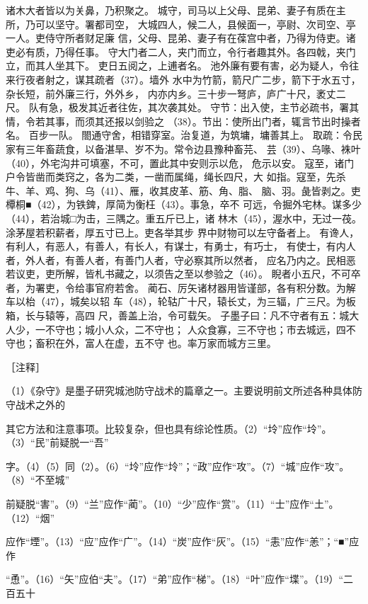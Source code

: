 \documentclass[12pt,UTF8]{ctexbook}
\begin{document}
诸木大者皆以为关鼻，乃积聚之。 
城守，司马以上父母、昆弟、妻子有质在主所，乃可以坚守。署都司空， 
大城四人，候二人，县候面一，亭尉、次司空、亭一人。吏侍守所者财足廉 
信，父母、昆弟、妻子有在葆宫中者，乃得为侍吏。诸吏必有质，乃得任事。 
守大门者二人，夹门而立，令行者趣其外。各四戟，夹门立，而其人坐其下。 
吏日五阅之，上逋者名。 
池外廉有要有害，必为疑人，令往来行夜者射之，谋其疏者（37）。墙外 
水中为竹箭，箭尺广二步，箭下于水五寸，杂长短，前外廉三行，外外乡， 
内亦内乡。三十步一弩庐，庐广十尺，袤丈二尺。 
队有急，极发其近者往佐，其次袭其处。 
守节：出入使，主节必疏书，署其情，令若其事，而须其还报以剑验之 
（38）。节出：使所出门者，辄言节出时操者名。 
百步一队。 
閤通守舍，相错穿室。治复道，为筑墉，墉善其上。 
取疏：令民家有三年畜蔬食，以备湛旱、岁不为。常令边县豫种畜芫、 
芸（39）、乌喙、袾叶（40），外宅沟井可填塞，不可，置此其中安则示以危， 
危示以安。 
寇至，诸门户令皆凿而类窍之，各为二类，一凿而属绳，绳长四尺，大 
如指。寇至，先杀牛、羊、鸡、狗、乌（41）、雁，收其皮革、筋、角、脂、 
脑、羽。彘皆剥之。吏橝桐■（42），为铁錍，厚简为衡枉（43）。事急，卒不 
可远，令掘外宅林。谋多少（44），若治城□为击，三隅之。重五斤已上，诸 
林木（45），渥水中，无过一茷。涂茅屋若积薪者，厚五寸已上。吏各举其步 
界中财物可以左守备者上。 
有谗人，有利人，有恶人，有善人，有长人，有谋士，有勇士，有巧士， 
有使士，有内人者，外人者，有善人者，有善门人者，守必察其所以然者， 
应名乃内之。民相恶若议吏，吏所解，皆札书藏之，以须告之至以参验之（46）。 
睨者小五尺，不可卒者，为署吏，令给事官府若舍。 
蔺石、厉矢诸材器用皆谨部，各有积分数。为解车以枱（47），城矣以轺 
车（48），轮轱广十尺，辕长丈，为三辐，广三尺。为板箱，长与辕等，高四 
尺，善盖上治，令可载矢。 
子墨子曰：凡不守者有五：城大人少，一不守也；城小人众，二不守也； 
人众食寡，三不守也；市去城远，四不守也；畜积在外，富人在虚，五不守 
也。率万家而城方三里。 


［注释］ 

（1）《杂守》是墨子研究城池防守战术的篇章之一。主要说明前文所述各种具体防守战术之外的 

其它方法和注意事项。比较复杂，但也具有综论性质。（2）“坽”应作“坽”。（3）“民”前疑脱一“吾” 

字。（4）（5）同（2）。（6）“坽”应作“坽”；“政”应作“攻”。（7）“城”应作“攻”。（8）“不至城” 

前疑脱“害”。（9）“兰”应作“蔺”。（10）“少”应作“赏”。（11）“士”应作“土”。（12）“烟” 

应作“堙”。（13）“应”应作“广”。（14）“炭”应作“灰”。（15）“恚”应作“恙”；“■”应作 

“恿”。（16）“矢”应伯“夫”。（17）“弟”应作“梯”。（18）“叶”应作“堞”。（19）“二百五十 
\end{document}
